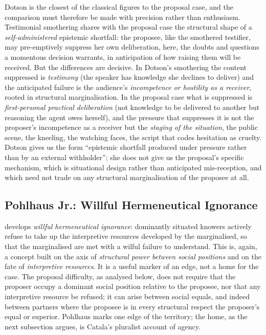 \documentclass[11pt,a4paper]{article}
\begin{document}
Dotson is the closest of the classical figures to the proposal case, and the comparison must therefore be made with precision rather than enthusiasm. Testimonial smothering shares with the proposal case the structural shape of a \emph{self-administered} epistemic shortfall: the proposee, like the smothered testifier, may pre-emptively suppress her own deliberation, here, the doubts and questions a momentous decision warrants, in anticipation of how raising them will be received. But the differences are decisive. In Dotson's smothering the content suppressed is \emph{testimony} (the speaker has knowledge she declines to deliver) and the anticipated failure is the audience's \emph{incompetence or hostility as a receiver}, rooted in structural marginalisation. In the proposal case what is suppressed is \emph{first-personal practical deliberation} (not knowledge to be delivered to another but reasoning the agent owes herself), and the pressure that suppresses it is not the proposer's incompetence as a receiver but the \emph{staging of the situation}, the public scene, the kneeling, the watching faces, the script that codes hesitation as cruelty. Dotson gives us the form ``epistemic shortfall produced under pressure rather than by an external withholder''; she does not give us the proposal's specific mechanism, which is situational design rather than anticipated mis-reception, and which need not trade on any structural marginalisation of the proposee at all.

\subsection{Pohlhaus Jr.: Willful Hermeneutical Ignorance}

\textcite{pohlhaus2012relational} develops \emph{willful hermeneutical ignorance}: dominantly situated knowers actively refuse to take up the interpretive resources developed by the marginalised, so that the marginalised are met with a wilful failure to understand. This is, again, a concept built on the axis of \emph{structural power between social positions} and on the fate of \emph{interpretive resources}. It is a useful marker of an edge, not a home for the case. The proposal difficulty, as analysed below, does not require that the proposer occupy a dominant social position relative to the proposee, nor that any interpretive resource be refused; it can arise between social equals, and indeed between partners where the proposee is in every structural respect the proposer's equal or superior. Pohlhaus marks one edge of the territory; the home, as the next subsection argues, is Catala's pluralist account of agency.
\end{document}
